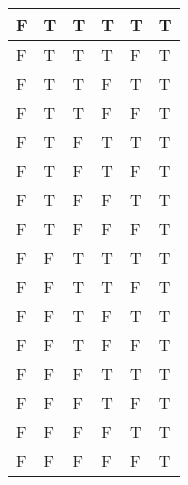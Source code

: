 \documentclass[10.5pt]{article}
\newenvironment{solution}[2][Solution]{ \begin{trivlist}
\item[\hskip \labelsep {\bfseries #1}]}{\end{trivlist}}
\begin{document}
\begin{solution}{2}
\begin{table}[!h]
\begin{tabular}{|l|l|l|l|l|l|}
F & T & T & T & T & T                                                                    \\ \hline
F & T & T & T & F & T                                                                    \\ \hline
F & T & T & F & T & T                                                                    \\ \hline
F & T & T & F & F & T                                                                    \\ \hline
F & T & F & T & T & T                                                                    \\ \hline
F & T & F & T & F & T                                                                    \\ \hline
F & T & F & F & T & T                                                                    \\ \hline
F & T & F & F & F & T                                                                    \\ \hline
F & F & T & T & T & T                                                                    \\ \hline
F & F & T & T & F & T                                                                    \\ \hline
F & F & T & F & T & T                                                                    \\ \hline
F & F & T & F & F & T                                                                    \\ \hline
F & F & F & T & T & T                                                                    \\ \hline
F & F & F & T & F & T                                                                    \\ \hline
F & F & F & F & T & T                                                                    \\ \hline
F & F & F & F & F & T                                                                    \\ \hline
\end{tabular}
\end{table}

\end{solution}
\end{document}
